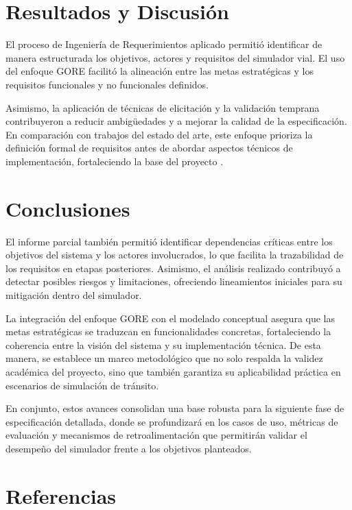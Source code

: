 \documentclass[12pt]{article}
\begin{document}
\section{Resultados y Discusión}

El proceso de Ingeniería de Requerimientos aplicado permitió identificar de manera estructurada los objetivos, actores y requisitos del simulador vial. El uso del enfoque GORE facilitó la alineación entre las metas estratégicas y los requisitos funcionales y no funcionales definidos.

Asimismo, la aplicación de técnicas de elicitación y la validación temprana contribuyeron a reducir ambigüedades y a mejorar la calidad de la especificación. En comparación con trabajos del estado del arte, este enfoque prioriza la definición formal de requisitos antes de abordar aspectos técnicos de implementación, fortaleciendo la base del proyecto \cite{Ferrari2021}.

\newpage
\section{Conclusiones}
El informe parcial también permitió identificar dependencias críticas entre los objetivos del sistema y los actores involucrados, lo que facilita la trazabilidad de los requisitos en etapas posteriores. Asimismo, el análisis realizado contribuyó a detectar posibles riesgos y limitaciones, ofreciendo lineamientos iniciales para su mitigación dentro del simulador.

La integración del enfoque GORE con el modelado conceptual asegura que las metas estratégicas se traduzcan en funcionalidades concretas, fortaleciendo la coherencia entre la visión del sistema y su implementación técnica. De esta manera, se establece un marco metodológico que no solo respalda la validez académica del proyecto, sino que también garantiza su aplicabilidad práctica en escenarios de simulación de tránsito.

En conjunto, estos avances consolidan una base robusta para la siguiente fase de especificación detallada, donde se profundizará en los casos de uso, métricas de evaluación y mecanismos de retroalimentación que permitirán validar el desempeño del simulador frente a los objetivos planteados.

\newpage
\section{Referencias}
\printbibliography
\end{document}
